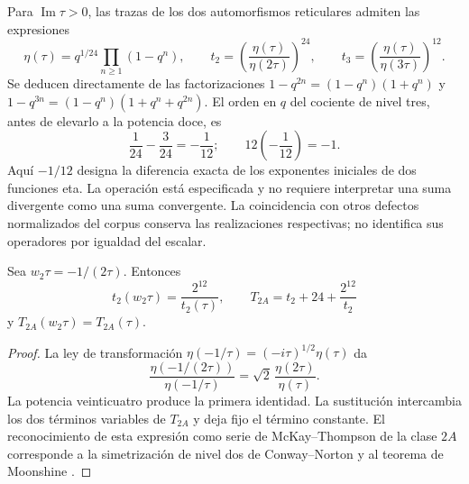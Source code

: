 Para \(\operatorname{Im}\tau>0\), las trazas de los dos automorfismos
reticulares admiten las expresiones
\begin{equation}
 \eta(\tau)=q^{1/24}\prod_{n\ge1}(1-q^n),\qquad
 t_2=\left(\frac{\eta(\tau)}{\eta(2\tau)}\right)^{24},\qquad
 t_3=\left(\frac{\eta(\tau)}{\eta(3\tau)}\right)^{12}.
 \label{x_reciprocidad:km:eta-trazas}
\end{equation}
Se deducen directamente de las factorizaciones
\(1-q^{2n}=(1-q^n)(1+q^n)\) y
\(1-q^{3n}=(1-q^n)(1+q^n+q^{2n})\). El orden en \(q\) del
cociente de nivel tres, antes de elevarlo a la potencia doce, es
\[
 \frac1{24}-\frac3{24}=-\frac1{12};
 \qquad 12\left(-\frac1{12}\right)=-1.
\]
Aquí \(-1/12\) designa la diferencia exacta de los exponentes
iniciales de dos funciones eta. La operación está especificada y no
requiere interpretar una suma divergente como una suma convergente.
La coincidencia con otros defectos normalizados del corpus conserva
las realizaciones respectivas; no identifica sus operadores por
igualdad del escalar.

\begin{proposition}
\label{x_reciprocidad:km:fricke-prop}
Sea \(w_2\tau=-1/(2\tau)\). Entonces
\begin{equation}
 t_2(w_2\tau)=\frac{2^{12}}{t_2(\tau)},\qquad
 T_{2A}=t_2+24+\frac{2^{12}}{t_2}
 \label{x_reciprocidad:km:fricke-t2}
\end{equation}
y \(T_{2A}(w_2\tau)=T_{2A}(\tau)\).
\end{proposition}
\begin{proof}
La ley de transformación
\(\eta(-1/\tau)=(-i\tau)^{1/2}\eta(\tau)\) da
\[
 \frac{\eta(-1/(2\tau))}{\eta(-1/\tau)}
 =\sqrt2\,\frac{\eta(2\tau)}{\eta(\tau)}.
\]
La potencia veinticuatro produce la primera identidad. La sustitución
intercambia los dos términos variables de \(T_{2A}\) y deja fijo
el término constante. El reconocimiento de esta expresión como serie
de McKay--Thompson de la clase \(2A\) corresponde a la
simetrización de nivel dos de Conway--Norton
\cite[\S\S4 y 6, tabla~3]{x_reciprocidad:kmconwaynorton1979} y al teorema
de Moonshine \cite{x_reciprocidad:borcherds}.
\end{proof}

